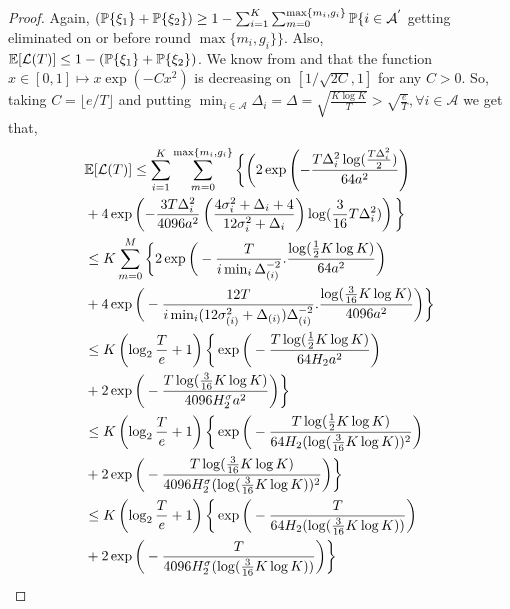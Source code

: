 \begin{proof}
Again, $(\mathbb{P}\lbrace \xi_1\rbrace  + \mathbb{P}\lbrace \xi_2 \rbrace)\geq 1- \sum_{i=1}^{K}\sum_{m=0}^{\max\lbrace m_{i} ,g_{i}\rbrace}\mathbb{P}\lbrace i\in \mathcal{A}^{'}$ getting eliminated on or before round $\max\lbrace m_i, g_i\rbrace \rbrace $.
Also, $\mathbb{E}[\mathcal{L}(T)]\le 1- (\mathbb{P}\lbrace \xi_1\rbrace  + \mathbb{P}\lbrace \xi_2 \rbrace) $. We know from \cite{bubeck2011pure} and \cite{auer2010ucb} that the function $x\in [0,1]\mapsto x\exp(-Cx^2)$ is  decreasing on $[1/\sqrt{2C},1]$ for any $C>0$. So, taking $C=\lfloor e/T\rfloor$ and putting $\min_{i\in \mathcal{A}}\Delta_i =\Delta =\sqrt{\frac{K\log K}{T}} > \sqrt{\frac{e}{T}},\forall i\in \mathcal{A}$ we get that,
\begin{align*}
&\mathbb{E}[\mathcal{L}(T)] \leq \sum_{i=1}^{K}\sum_{m=0}^{\max\lbrace m_{i} ,g_{i}\rbrace}\bigg\lbrace \bigg( 2\exp\left(-\frac{T\Delta_{i}^{2} \log(\frac{T\Delta_{i}^{2}}{2})}{64 a^2 }\right) \\
& + 4\exp\left(- \frac{3T\Delta_{i}^{2}}{4096 a^2 } \left(\frac{4\sigma_{i}^{2}+\Delta_{i}+4}{12\sigma_{i}^{2}+\Delta_{i}}\right) \log( \frac{3}{16} T\Delta_{i}^{2}) \right)\bigg\rbrace\\
& \leq K\sum_{m=0}^{M}\bigg\lbrace 2\exp\bigg( -\frac{T}{i\min_{i}\Delta_{(i)}^{-2}}.\frac{\log (\frac{1}{2} K\log K)}{64 a^2 }\bigg)\\
& + 4\exp\bigg(- \frac{12T}{i\min_i(12\sigma_{(i)}^{2}+ \Delta_{(i)})\Delta_{(i)}^{-2}}.\frac{\log (\frac{3}{16} K\log K)}{4096 a^2 } \bigg)\bigg\rbrace\\
&\leq K\left(\log_2\frac{T}{e}+1\right)\bigg\lbrace\exp\bigg( -\frac{T\log ( \frac{1}{2} K\log K)}{ 64 H_2 a^2}\bigg)\\
& + 2\exp\bigg(- \frac{T\log ( \frac{3}{16} K\log K)}{4096 H_{2}^{\sigma} a^2} \bigg)\bigg\rbrace\\
&\leq K\left(\log_2\frac{T}{e}+1\right)\bigg\lbrace\exp\bigg( -\frac{T\log ( \frac{1}{2} K\log K)}{ 64 H_2 (\log(\frac{3}{16} K\log K))^{2}}\bigg)\\
& + 2\exp\bigg(- \frac{T\log ( \frac{3}{16} K\log K)}{4096 H_{2}^{\sigma} (\log(\frac{3}{16} K\log K))^{2}} \bigg)\bigg\rbrace\\
&\leq K\left(\log_2\frac{T}{e}+1\right)\bigg\lbrace\exp\bigg( -\frac{T}{ 64 H_2 (\log(\frac{3}{16} K\log K))}\bigg)\\
& + 2\exp\bigg(- \frac{T}{4096 H_{2}^{\sigma} (\log(\frac{3}{16} K\log K))} \bigg)\bigg\rbrace\\
\end{align*}
\end{proof}

